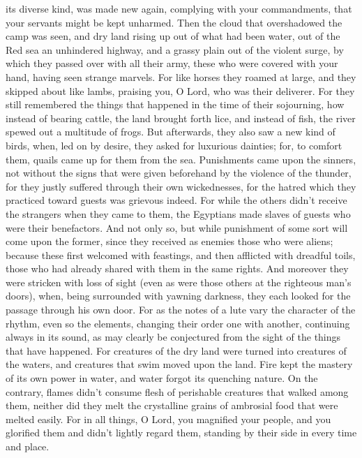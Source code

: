 its diverse kind, was made new again, complying with your commandments,
that your servants might be kept unharmed.  Then the cloud
that overshadowed the camp was seen, and dry land rising up out of what
had been water, out of the Red sea an unhindered highway, and a grassy
plain out of the violent surge,  by which they passed over
with all their army, these who were covered with your hand, having seen
strange marvels.  For like horses they roamed at large, and
they skipped about like lambs, praising you, O Lord, who was their
deliverer.  For they still remembered the things that
happened in the time of their sojourning, how instead of bearing cattle,
the land brought forth lice, and instead of fish, the river spewed out a
multitude of frogs.  But afterwards, they also saw a new
kind of birds, when, led on by desire, they asked for luxurious
dainties;  for, to comfort them, quails came up for them
from the sea.  Punishments came upon the sinners, not
without the signs that were given beforehand by the violence of the
thunder, for they justly suffered through their own wickednesses, for
the hatred which they practiced toward guests was grievous indeed.
 For while the others didn't receive the strangers when
they came to them, the Egyptians made slaves of guests who were their
benefactors.  And not only so, but while punishment of some
sort will come upon the former, since they received as enemies those who
were aliens;  because these first welcomed with feastings,
and then afflicted with dreadful toils, those who had already shared
with them in the same rights.  And moreover they were
stricken with loss of sight (even as were those others at the righteous
man's doors), when, being surrounded with yawning darkness, they each
looked for the passage through his own door.  For as the
notes of a lute vary the character of the rhythm, even so the elements,
changing their order one with another, continuing always in its sound,
as may clearly be conjectured from the sight of the things that have
happened.  For creatures of the dry land were turned into
creatures of the waters, and creatures that swim moved upon the land.
 Fire kept the mastery of its own power in water, and water
forgot its quenching nature.  On the contrary, flames
didn't consume flesh of perishable creatures that walked among them,
neither did they melt the crystalline grains of ambrosial food that were
melted easily.  For in all things, O Lord, you magnified
your people, and you glorified them and didn't lightly regard them,
standing by their side in every time and place.
